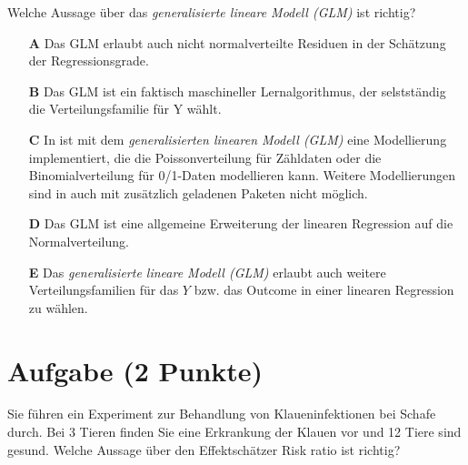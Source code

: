 \documentclass[a4paper, 9pt]{scrartcl}\usepackage[]{graphicx}\usepackage[]{xcolor}
\begin{document}
Welche Aussage über das \textit{generalisierte lineare Modell (GLM)} ist richtig?




\begin{enumerate}
\item [\textbf{A} \msquare] Das GLM erlaubt auch nicht normalverteilte Residuen in der Schätzung der Regressionsgrade.
\item [\textbf{B} \msquare] Das GLM ist ein faktisch maschineller Lernalgorithmus, der selstständig die Verteilungsfamilie für Y wählt.
\item [\textbf{C} \msquare] In \Rlogo ist mit dem \textit{generalisierten linearen Modell (GLM)} eine Modellierung implementiert, die die Poissonverteilung für Zähldaten oder die Binomialverteilung für 0/1-Daten modellieren kann. Weitere Modellierungen sind in \Rlogo auch mit zusätzlich geladenen Paketen nicht möglich.
\item [\textbf{D} \msquare] Das GLM ist eine allgemeine Erweiterung der linearen Regression auf die Normalverteilung.
\item [\textbf{E} \msquare] Das \textit{generalisierte lineare Modell (GLM)} erlaubt auch weitere Verteilungsfamilien für das $Y$ bzw. das Outcome in einer linearen Regression zu wählen.
\end{enumerate}

\section{Aufgabe \hfill (2 Punkte)}

\ifcollection
\begin{flushright}
\tiny\vspace{-2Ex}
\textbf{\examinhaltstart}
\exammodulebiostat
\vspace{-1Ex}
\end{flushright}
\fi




Sie führen ein Experiment zur Behandlung von Klaueninfektionen bei Schafe durch. Bei 3 Tieren finden Sie eine Erkrankung der Klauen vor und 12 Tiere sind gesund. Welche Aussage über den Effektschätzer Risk ratio ist richtig?
\end{document}
